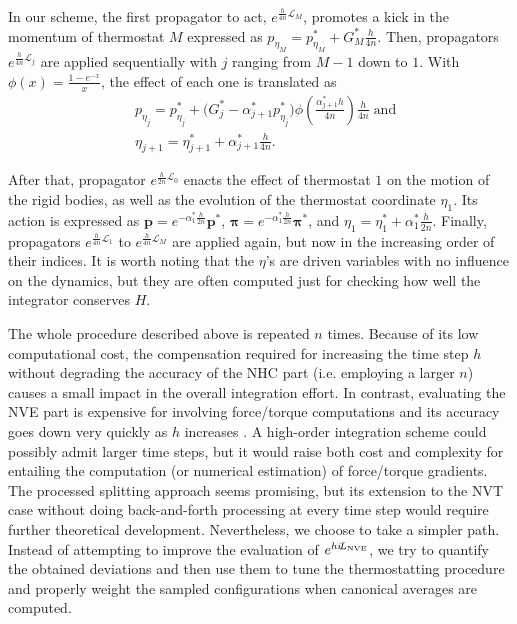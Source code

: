 \documentclass[journal=jctcce,manuscript=article,layout=twocolumn]{achemso}
\newcommand{\vt}[1]{\boldsymbol{\mathbf{#1}}}   %
\newcommand{\Liu}[1]{i\!L_\text{#1}}            %
\newcommand{\timestep}{h}
\newcommand{\modified}[1]{\widetilde{#1}}
\begin{document}
In our scheme, the first propagator to act, $e^{\frac{\timestep}{4n} \mathcal{L}_M}$, promotes a kick in the momentum of thermostat $M$ expressed as $p_{\eta_M} = p_{\eta_M}^\ast + G_M^\ast \frac{\timestep}{4n}$. Then, propagators $e^{\frac{\timestep}{4n} \mathcal{L}_j}$ are applied sequentially with $j$ ranging from $M-1$ down to $1$. With $\phi(x) = \frac{1-e^{-x}}{x}$, the effect of each one is translated as
\begin{align*}
&p_{\eta_j} = p_{\eta_j}^\ast + \Big( G_j^\ast - \alpha_{j+1}^\ast p_{\eta_j}^\ast \Big) \phi\left(\frac{\alpha_{j+1}^\ast \timestep}{4n}\right) \frac{\timestep}{4n} \; \text{and} \\
&\eta_{j+1} = \eta_{j+1}^\ast + \alpha_{j+1}^\ast \frac{\timestep}{4n}.
\end{align*}

After that, propagator $e^{\frac{\timestep}{2n} \mathcal{L}_0}$ enacts the effect of thermostat $1$ on the motion of the rigid bodies, as well as the evolution of the thermostat coordinate $\eta_1$. Its action is expressed as ${\vt p} = e^{-\alpha_1^\ast \frac{\timestep}{2n}} {\vt p}^\ast$, ${\vt \pi} = e^{-\alpha_1^\ast \frac{\timestep}{2n}} {\vt \pi}^\ast$, and $\eta_1 = \eta_1^\ast + \alpha_1^\ast \frac{\timestep}{2n}$.
Finally, propagators $e^{\frac{\timestep}{4n} \mathcal{L}_1}$ to $e^{\frac{\timestep}{4n} \mathcal{L}_M}$ are applied again, but now in the increasing order of their indices. It is worth noting that the $\eta$'s are driven variables with no influence on the dynamics, but they are often computed just for checking how well the integrator conserves $H$.

The whole procedure described above is repeated $n$ times. Because of its low computational cost, the compensation required for increasing the time step $\timestep$ without degrading the accuracy of the NHC part (i.e. employing a larger $n$) causes a small impact in the overall integration effort. In contrast, evaluating the NVE part is expensive for involving force/torque computations and its accuracy goes down very quickly as $\timestep$ increases \cite{Davidchack_2010, Silveira_2017}. A high-order integration scheme\cite{Omelyan_2007, vanZon_2008} could possibly admit larger time steps, but it would raise both cost and complexity for entailing the computation (or numerical estimation) of force/torque gradients. The processed splitting approach \cite{Omelyan_2008} seems promising, but its extension to the NVT case without doing back-and-forth processing at every time step would require further theoretical development. Nevertheless, we choose to take a simpler path. Instead of attempting to improve the evaluation of $e^{\timestep \Liu{\tiny NVE}}$, we try to quantify the obtained deviations and then use them to tune the thermostatting procedure and properly weight the sampled configurations when canonical averages are computed.
\end{document}
